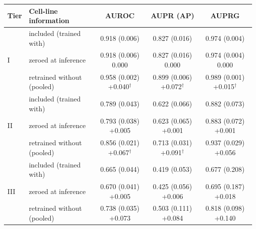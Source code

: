 \begin{tabular}{ll|ccc}
\hline
Tier & Cell-line information & AUROC & AUPR (AP) & AUPRG \\
\hline
\multirow{3}{*}{I} & included (trained with) & 0.918 (0.006) & 0.827 (0.016) & 0.974 (0.004) \\
 & zeroed at inference & 0.918 (0.006) {\scriptsize 0.000} & 0.827 (0.016) {\scriptsize 0.000} & 0.974 (0.004) {\scriptsize 0.000} \\
 & retrained without (pooled) & 0.958 (0.002) {\scriptsize +0.040$^\dagger$} & 0.899 (0.006) {\scriptsize +0.072$^\dagger$} & 0.989 (0.001) {\scriptsize +0.015$^\dagger$} \\
\hline
\multirow{3}{*}{II} & included (trained with) & 0.789 (0.043) & 0.622 (0.066) & 0.882 (0.073) \\
 & zeroed at inference & 0.793 (0.038) {\scriptsize +0.005} & 0.623 (0.065) {\scriptsize +0.001} & 0.883 (0.072) {\scriptsize +0.001} \\
 & retrained without (pooled) & 0.856 (0.021) {\scriptsize +0.067$^\dagger$} & 0.713 (0.031) {\scriptsize +0.091$^\dagger$} & 0.937 (0.029) {\scriptsize +0.056} \\
\hline
\multirow{3}{*}{III} & included (trained with) & 0.665 (0.044) & 0.419 (0.053) & 0.677 (0.208) \\
 & zeroed at inference & 0.670 (0.041) {\scriptsize +0.005} & 0.425 (0.056) {\scriptsize +0.006} & 0.695 (0.187) {\scriptsize +0.018} \\
 & retrained without (pooled) & 0.738 (0.035) {\scriptsize +0.073} & 0.503 (0.111) {\scriptsize +0.084} & 0.818 (0.098) {\scriptsize +0.140} \\
\hline
\end{tabular}
